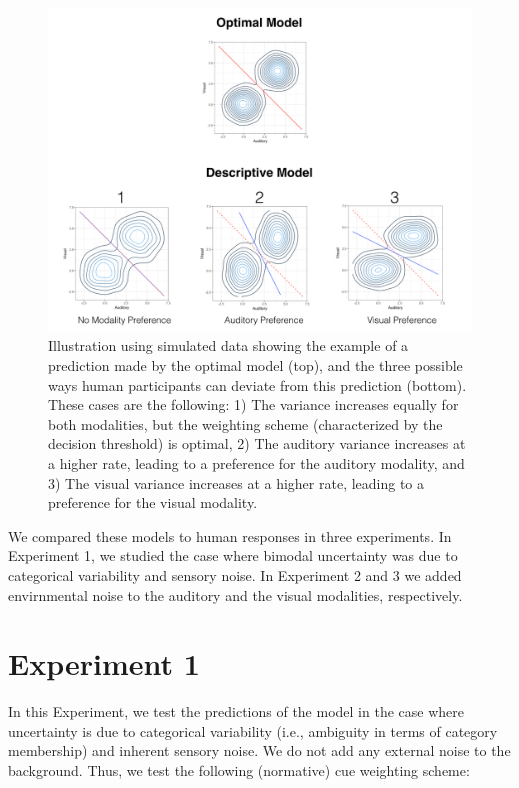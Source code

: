 \documentclass[english,,man,floatsintext]{apa6}
\theoremstyle{definition}
\theoremstyle{definition}
\theoremstyle{definition}
\theoremstyle{remark}
\begin{document}
\begin{figure}[!h]
\includegraphics[width=\textwidth]{pictures/sub-optimal} \caption{Illustration using simulated data showing the example of a prediction made by the optimal model (top), and the three possible ways human participants can deviate from this prediction (bottom). These cases are the following: 1) The variance increases equally for both modalities, but the weighting scheme (characterized by the decision threshold) is optimal, 2) The auditory variance increases at a higher rate, leading to a preference for the auditory modality, and 3) The visual variance increases at a higher rate, leading to a preference for the visual modality.}\label{fig:subOptim}
\end{figure}

We compared these models to human responses in three experiments. In
Experiment 1, we studied the case where bimodal uncertainty was due to
categorical variability and sensory noise. In Experiment 2 and 3 we
added envirnmental noise to the auditory and the visual modalities,
respectively.

\section{Experiment 1}\label{experiment-1}

In this Experiment, we test the predictions of the model in the case
where uncertainty is due to categorical variability (i.e., ambiguity in
terms of category membership) and inherent sensory noise. We do not add
any external noise to the background. Thus, we test the following
(normative) cue weighting scheme:
\end{document}
